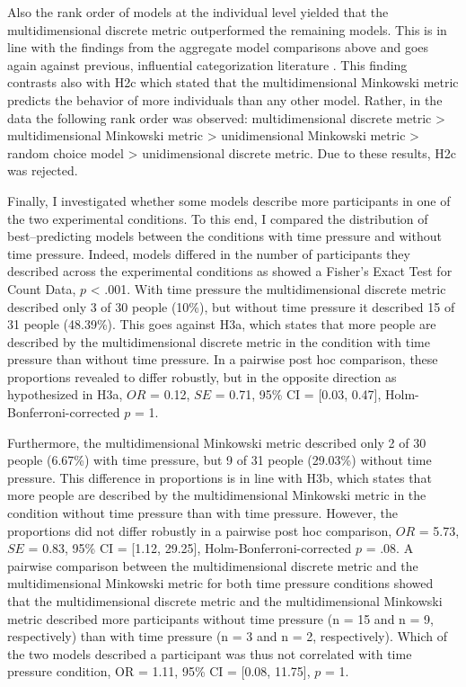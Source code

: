 \documentclass[a4paper,man,natbib]{apa6}
\begin{document}
Also the rank order of models at the individual level yielded that the multidimensional discrete metric outperformed the remaining models. This is in line with the findings from the aggregate model comparisons above and goes again against previous, influential categorization literature \citep{nosofsky1986attention, nosofsky1989further, smith1998prototypes, nosofsky1994rule, nosofsky1984choice}. This finding contrasts also with H2c which stated that the multidimensional Minkowski metric predicts the behavior of more individuals than any other model. Rather, in the data the following rank order was observed: multidimensional discrete metric > multidimensional Minkowski metric > unidimensional Minkowski metric > random choice model > unidimensional discrete metric. Due to these results, H2c was rejected.

Finally, I investigated whether some models describe more participants in one of the two experimental conditions. To this end, I compared the distribution of best--predicting models between the conditions with time pressure and without time pressure. Indeed, models differed in the number of participants they described across the experimental conditions as showed a Fisher's Exact Test for Count Data, $p$ < .001. With time pressure the multidimensional discrete metric described only 3 of 30 people (10\%), but without time pressure it described 15 of 31 people (48.39\%). This goes against H3a, which states that more people are described by the multidimensional discrete metric in the condition with time pressure than without time pressure. In a pairwise post hoc comparison, these proportions revealed to differ robustly, but in the opposite direction as hypothesized in H3a, $OR$ = 0.12, $SE$ = 0.71, 95\% CI = [0.03, 0.47], Holm-Bonferroni-corrected $p$ = 1.

Furthermore, the multidimensional Minkowski metric described only 2 of 30 people (6.67\%) with time pressure, but 9 of 31 people (29.03\%) without time pressure. This difference in proportions is in line with H3b, which states that more people are described by the multidimensional Minkowski metric in the condition without time pressure than with time pressure. However, the proportions did not differ robustly in a pairwise post hoc comparison, $OR$ = 5.73, $SE$ = 0.83, 95\% CI = [1.12, 29.25], Holm-Bonferroni-corrected $p$ = .08.
A pairwise comparison between the multidimensional discrete metric and the multidimensional Minkowski metric for both time pressure conditions showed that the multidimensional discrete metric and the multidimensional Minkowski metric described more participants without time pressure (n = 15 and n = 9, respectively) than with time pressure (n = 3 and n = 2, respectively). Which of the two models described a participant was thus not correlated with time pressure condition, OR = 1.11, 95\% CI = [0.08, 11.75], $p$ = 1.
\end{document}
